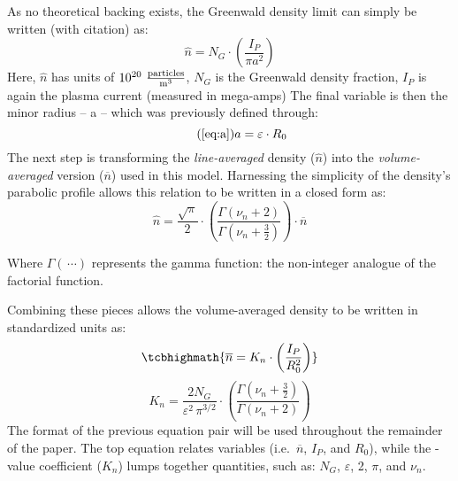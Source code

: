 As no theoretical backing exists, the Greenwald density limit can simply be written (with citation) as: \cite{greenwald}
\begin{equation}
	\hat n = N_G \cdot \left( \frac{ I_P }{ \pi a^2} \right)
\end{equation}
Here, $\hat n$ has units of $10^{20} \ \frac{\textnormal{particles}}{\textnormal{m}^3}$, $N_G$ is the Greenwald density fraction,  $I_P$ is again the plasma current (measured in mega-amps)  The final variable is then the minor radius -- a -- which was previously defined through:
\begin{equation}
	\tag{\ref{eq:a}}
	a = \varepsilon \cdot R_0
\end{equation}
The next step is transforming the \emph{line-averaged} density ($\hat n$) into the \emph{volume-averaged} version ($\overline n$) used in this model. Harnessing the simplicity of the density's parabolic profile allows this relation to be written in a closed form as:
 \begin{equation}
 	\hat n = \frac{\sqrt{\pi}}{2} \cdot \left( \frac{\Gamma \left( \nu_n + 2 \right)}{\Gamma \left( \nu_n + \frac{3}{2} \right)} \right) \cdot \overline n
 \end{equation}

 Where $\Gamma( \, \cdots)$ represents the gamma function: the non-integer analogue of the factorial function.

 Combining these pieces allows the volume-averaged density to be written in standardized units as:
\begin{equation}
 	\label{eq:greenwald}
 	\tcbhighmath{
 	\overline n = K_n \cdot \left( \frac{I_P}{R_0^2} \right)
 	}
\end{equation}
 \begin{equation}
  \label{eq:kn}
 	K_n = \frac{2 N_G}{\varepsilon^2 \, \pi^{3/2} } \cdot \left( \frac{\Gamma \left( \nu_n + \frac{3}{2} \right)}{\Gamma \left( \nu_n + 2 \right)} \right)
\end{equation}
The format of the previous equation pair will be used throughout the remainder of the paper. The top equation relates  variables (i.e.\ $\overline n$, $I_P$, and $R_0$), while the -value coefficient ($K_n$) lumps together  quantities, such as: $N_G$, $\varepsilon$, 2, $\pi$, and $\nu_n$.

